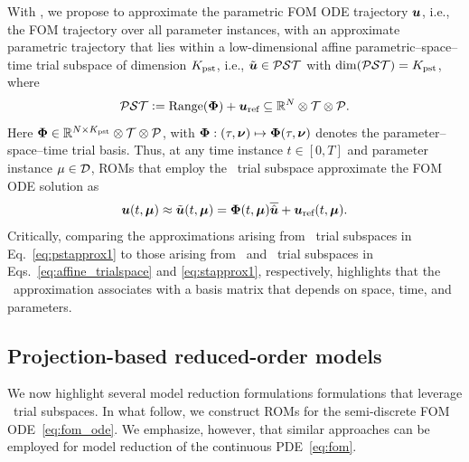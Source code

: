 \documentclass[3p,computermodern,10pt]{elsarticle}
\begin{document}
With \parametricSpaceTimeAcronym, we propose to approximate the parametric FOM ODE trajectory $\boldsymbol u$, i.e., the FOM trajectory over all parameter instances, with an approximate parametric trajectory that lies within a low-dimensional affine parametric--space--time trial subspace of dimension $K_{\text{pst}}$, i.e., $\tilde{\boldsymbol u} \in \mathcal{PST}$ with $\dim(\mathcal{PST}) = K_{\text{pst}}$, where
\begin{equation}\label{eq:psttrialspace_def}
 \mathcal{PST} \vcentcolon= 
        \text{Range}(\boldsymbol \Phi) + 
        \boldsymbol u_{\text{ref}} 
        \subseteq \mathbb{R}^{N} \otimes \mathcal{T} \otimes \mathcal{P}.
\end{equation}
Here $\boldsymbol \Phi \in \mathbb{R}^{N \times K_{\text{pst}}} \otimes \mathcal{T} \otimes \mathcal{P}$, with $\boldsymbol \Phi:(\tau,\boldsymbol \nu) \mapsto\boldsymbol \Phi(\tau,\boldsymbol \nu)$ denotes the parameter--space--time trial basis. 
Thus, at any time instance $t\in[0,T]$ and parameter instance $\mu \in \mathcal{D}$, ROMs that employ the
\parametricSpaceTimeAcronym\ trial subspace approximate the FOM ODE solution as
\begin{equation}\label{eq:pstapprox1}
 \boldsymbol u(t,\boldsymbol \mu) \approx \tilde{\boldsymbol u}(t,\boldsymbol \mu) = \boldsymbol \Phi(t,\boldsymbol \mu) \overline{\hat{\boldsymbol u}} + \boldsymbol u_{\text{ref}}(t,\boldsymbol \mu).
\end{equation}
Critically, comparing the approximations arising from \parametricSpaceTimeAcronym\ trial subspaces in Eq.~\eqref{eq:pstapprox1} to those arising from \spatialAcronym\ and
\spaceTimeAcronym\ trial subspaces in Eqs.~\eqref{eq:affine_trialspace} and \eqref{eq:stapprox1}, respectively,
highlights that the \parametricSpaceTimeAcronym\ approximation associates with a basis matrix that depends on space, time, and parameters. 

\subsection{Projection-based reduced-order models}
We now highlight several model reduction formulations formulations that leverage \parametricSpaceTimeAcronym\ trial subspaces. In what follow, we construct ROMs for the semi-discrete FOM ODE~\eqref{eq:fom_ode}. We emphasize, however, that similar approaches can be employed for model reduction of the continuous PDE~\eqref{eq:fom}. 
\end{document}
